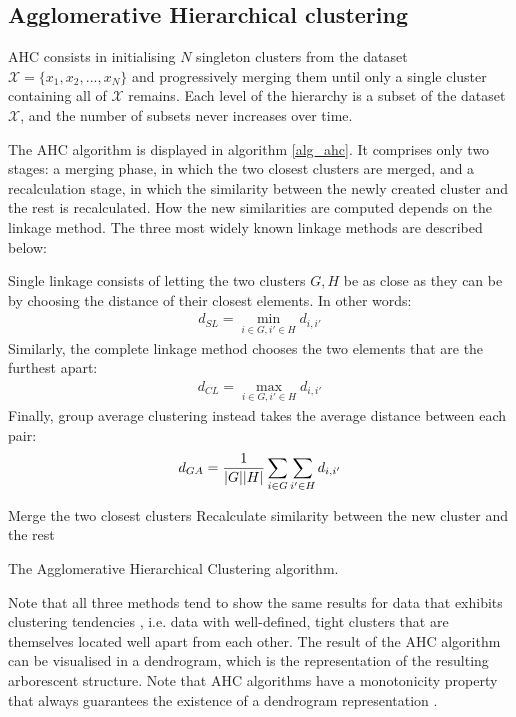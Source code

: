 \documentclass[pdftex,11pt,a4paper]{article}
\theoremstyle{definition}
\theoremstyle{remark}
\DeclarePairedDelimiter\abs{\lvert}{\rvert}%
\begin{document}
\subsection{Agglomerative Hierarchical clustering}
AHC consists in initialising $N$ singleton clusters from the dataset $\mathcal{X} = \{x_1, x_2, ..., x_N\}$ and progressively merging them until only a single cluster containing all of $\mathcal{X}$ remains. Each level of the hierarchy is a subset of the dataset $\mathcal{X}$, and the number of subsets never increases over time.
\par The AHC algorithm is displayed in algorithm \ref{alg_ahc}. It comprises only two stages: a merging phase, in which the two closest clusters are merged, and a recalculation stage, in which the similarity between the newly created cluster and the rest is recalculated. How the new similarities are computed depends on the linkage method. The three most widely known linkage methods \cite{hastie2008} are described below:
\par Single linkage consists of letting the two clusters $G, H$ be as close as they can be by choosing the distance of their closest elements. In other words:
\begin{align*}
d_{SL} = \min_{i \in G, i' \in H} d_{i, i'}
\end{align*}
Similarly, the complete linkage method chooses the two elements that are the furthest apart:
\begin{align*}
d_{CL} = \max_{i \in G, i' \in H} d_{i, i'}
\end{align*}
Finally, group average clustering instead takes the average distance between each pair:
\begin{align*}
d_{GA} = \frac{1}{\abs{G}\abs{H}}\sum_{i\in G}\sum_{i'\in H}d_{i, i'}
\end{align*}
\begin{algorithm}
\begin{algorithmic}[1]
\Repeat
\State Merge the two closest clusters
\State Recalculate similarity between the new cluster and the rest
\EndFunction
\caption{The Agglomerative Hierarchical Clustering algorithm.}\label{alg_ahc}
\end{algorithmic}
\end{algorithm}
\par Note that all three methods tend to show the same results for data that exhibits clustering tendencies \cite{hastie2008}, i.e. data with well-defined, tight clusters that are themselves located well apart from each other. The result of the AHC algorithm can be visualised in a dendrogram, which is the representation of the resulting arborescent structure. Note that AHC algorithms have a monotonicity property that always guarantees the existence of a dendrogram representation \cite{hastie2008}.
\end{document}
